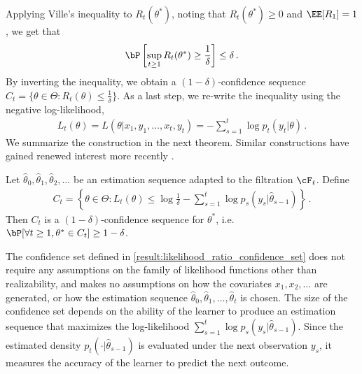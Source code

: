 Applying Ville's inequality to $R_t(\theta^*)$, noting that $R_t(\theta^*) \geq 0$ and $\EE[R_1] =1$, we get that
\begin{align*}
    \bP\left[\sup_{t \geq 1} R_t(\theta^*) \geq \frac{1}{\delta}\right] \leq \delta \,.
\end{align*}
By inverting the inequality, we obtain a $(1-\delta)$-confidence sequence $C_t = \{ \theta \in \Theta : R_t(\theta) \leq \frac{1}{\delta}\}$. As a last step, we re-write the inequality using the negative log-likelihood,
\begin{align*}
L_t(\theta) = L(\theta|x_1,y_1, \dots, x_t, y_t) = - \sum_{s=1}^t \log p_t(y_t|\theta) \,.
\end{align*}
We summarize the construction in the next theorem. Similar constructions have gained renewed interest more recently \citep[e.g.,][]{wasserman2020universal,Emm23}.
\begin{theorem} \label{result:likelihood_ratio_confidence_set}
   Let $\hat \theta_0, \hat \theta_1, \hat \theta_2, \dots$ be an estimation sequence adapted to the filtration $\cF_t$. Define
    \begin{align*}
        C_t = \left\{ \theta \in \Theta : L_t(\theta) \leq \log \frac{1}{\delta} - \sum_{s=1}^t \log p_s(y_s|\hat \theta_{s-1}) \right\} \,.
    \end{align*}
    Then $C_t$ is a $(1-\delta)$-confidence sequence for $\theta^*$, i.e.~$\bP[ \forall t \geq 1, \theta^* \in C_t ] \geq 1-\delta$.
\end{theorem}
The confidence set defined in \cref{result:likelihood_ratio_confidence_set} does not require any assumptions on the family of likelihood functions other than realizability, and makes no assumptions on how the covariates $x_1, x_2, \dots$ are generated, or how the estimation sequence $\hat \theta_0, \hat \theta_1, \dots, \hat \theta_t$ is chosen. The size of the confidence set depends on the ability of the learner to produce an estimation sequence that maximizes the log-likelihood $\sum_{s=1}^t \log p_s(y_s|\hat \theta_{s-1})$. Since the estimated density $p_t(\cdot |\hat \theta_{s-1})$ is evaluated under the next observation $y_s$, it measures the accuracy of the learner to predict the next outcome.


